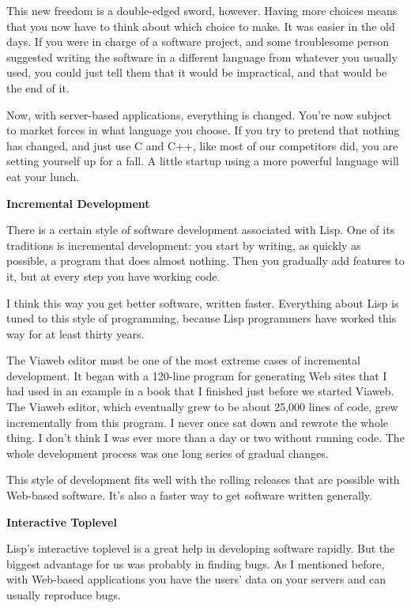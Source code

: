 \documentclass[12pt]{book}
\begin{document}
This new freedom is a double-edged sword, however. Having more choices
means that you now have to think about which choice to make. It was
easier in the old days. If you were in charge of a software project, and
some troublesome person suggested writing the software in a different
language from whatever you usually used, you could just tell them that
it would be impractical, and that would be the end of it.

Now, with server-based applications, everything is changed. You're now
subject to market forces in what language you choose. If you try to
pretend that nothing has changed, and just use C and C++, like most of
our competitors did, you are setting yourself up for a fall. A little
startup using a more powerful language will eat your lunch.

\textbf{Incremental Development}

There is a certain style of software development associated with Lisp.
One of its traditions is incremental development: you start by writing,
as quickly as possible, a program that does almost nothing. Then you
gradually add features to it, but at every step you have working code.

I think this way you get better software, written faster. Everything
about Lisp is tuned to this style of programming, because Lisp
programmers have worked this way for at least thirty years.

The Viaweb editor must be one of the most extreme cases of incremental
development. It began with a 120-line program for generating Web sites
that I had used in an example in a book that I finished just before we
started Viaweb. The Viaweb editor, which eventually grew to be about
25,000 lines of code, grew incrementally from this program. I never once
sat down and rewrote the whole thing. I don't think I was ever more than
a day or two without running code. The whole development process was one
long series of gradual changes.

This style of development fits well with the rolling releases that are
possible with Web-based software. It's also a faster way to get software
written generally.

\textbf{Interactive Toplevel}

Lisp's interactive toplevel is a great help in developing software
rapidly. But the biggest advantage for us was probably in finding bugs.
As I mentioned before, with Web-based applications you have the users'
data on your servers and can usually reproduce bugs.
\end{document}
